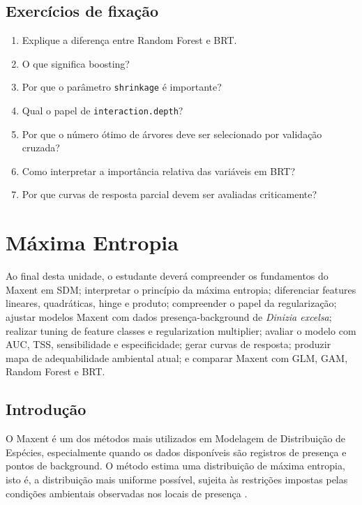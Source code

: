 \documentclass{ueap-sdm}
\begin{document}
\section{Exercícios de fixação}

\begin{enumerate}
	\item Explique a diferença entre Random Forest e BRT.
	\item O que significa boosting?
	\item Por que o parâmetro \texttt{shrinkage} é importante?
	\item Qual o papel de \texttt{interaction.depth}?
	\item Por que o número ótimo de árvores deve ser selecionado por validação cruzada?
	\item Como interpretar a importância relativa das variáveis em BRT?
	\item Por que curvas de resposta parcial devem ser avaliadas criticamente?
\end{enumerate}


\chapter[Maxent]{Máxima Entropia}

\begin{objetivos}
	Ao final desta unidade, o estudante deverá compreender os fundamentos do Maxent em SDM; interpretar o princípio da máxima entropia; diferenciar features lineares, quadráticas, hinge e produto; compreender o papel da regularização; ajustar modelos Maxent com dados presença-background de \textit{Dinizia excelsa}; realizar tuning de feature classes e regularization multiplier; avaliar o modelo com AUC, TSS, sensibilidade e especificidade; gerar curvas de resposta; produzir mapa de adequabilidade ambiental atual; e comparar Maxent com GLM, GAM, Random Forest e BRT.
\end{objetivos}

\section{Introdução}

O Maxent é um dos métodos mais utilizados em Modelagem de Distribuição de Espécies, especialmente quando os dados disponíveis são registros de presença e pontos de background. O método estima uma distribuição de máxima entropia, isto é, a distribuição mais uniforme possível, sujeita às restrições impostas pelas condições ambientais observadas nos locais de presença \parencite{phillips2006maximum,phillips2008modeling,elith2011statistical,merow2013practical,guisan2017habitat}.
\end{document}
